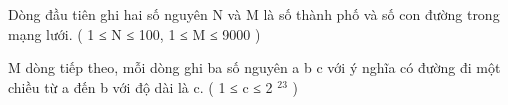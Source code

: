 Dòng đầu tiên ghi hai số nguyên N và M là số thành phố và số con đường trong mạng lưới. ( 1 ≤ N ≤ 100,  1 ≤ M ≤ 9000 )  

   M dòng tiếp theo, mỗi dòng ghi ba số nguyên a b c với ý nghĩa có đường đi một chiều từ a đến b với độ dài là c. ( 1 ≤ c ≤ 2   $^    23   $   )